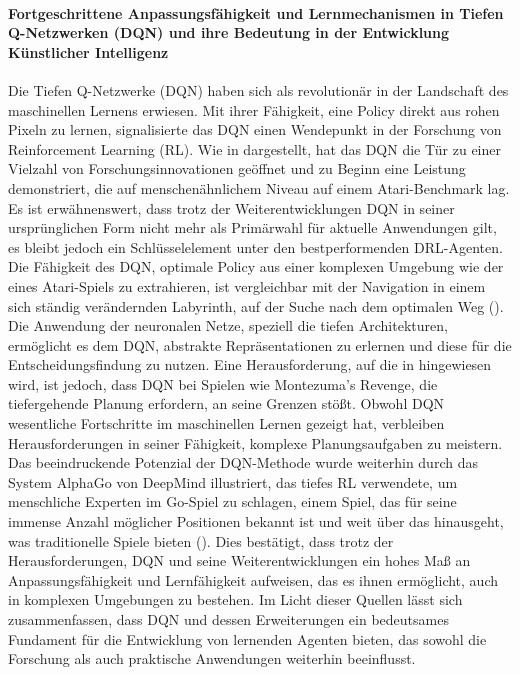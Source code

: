 \paragraph{Fortgeschrittene Anpassungsfähigkeit und Lernmechanismen in Tiefen Q-Netzwerken (DQN) und ihre Bedeutung in der Entwicklung Künstlicher Intelligenz}
%
Die Tiefen Q-Netzwerke (DQN) haben sich als revolutionär in der Landschaft des maschinellen Lernens erwiesen. Mit ihrer Fähigkeit, eine Policy direkt aus rohen Pixeln zu lernen, signalisierte das DQN einen Wendepunkt in der Forschung von Reinforcement Learning (RL). Wie in \cite{morales2020grokking} dargestellt, hat das DQN die Tür zu einer Vielzahl von Forschungsinnovationen geöffnet und zu Beginn eine Leistung demonstriert, die auf menschenähnlichem Niveau auf einem Atari-Benchmark lag. Es ist erwähnenswert, dass trotz der Weiterentwicklungen DQN in seiner ursprünglichen Form nicht mehr als Primärwahl für aktuelle Anwendungen gilt, es bleibt jedoch ein Schlüsselelement unter den bestperformenden DRL-Agenten.
%
Die Fähigkeit des DQN, optimale Policy aus einer komplexen Umgebung wie der eines Atari-Spiels zu extrahieren, ist vergleichbar mit der Navigation in einem sich ständig verändernden Labyrinth, auf der Suche nach dem optimalen Weg (\cite{russell2021ai}). Die Anwendung der neuronalen Netze, speziell die tiefen Architekturen, ermöglicht es dem DQN, abstrakte Repräsentationen zu erlernen und diese für die Entscheidungsfindung zu nutzen.
%
Eine Herausforderung, auf die in \cite{SuttonBarto2018} hingewiesen wird, ist jedoch, dass DQN bei Spielen wie Montezuma's Revenge, die tiefergehende Planung erfordern, an seine Grenzen stößt. Obwohl DQN wesentliche Fortschritte im maschinellen Lernen gezeigt hat, verbleiben Herausforderungen in seiner Fähigkeit, komplexe Planungsaufgaben zu meistern.
%
Das beeindruckende Potenzial der DQN-Methode wurde weiterhin durch das System AlphaGo von DeepMind illustriert, das tiefes RL verwendete, um menschliche Experten im Go-Spiel zu schlagen, einem Spiel, das für seine immense Anzahl möglicher Positionen bekannt ist und weit über das hinausgeht, was traditionelle Spiele bieten (\cite{russell2021ai}). Dies bestätigt, dass trotz der Herausforderungen, DQN und seine Weiterentwicklungen ein hohes Maß an Anpassungsfähigkeit und Lernfähigkeit aufweisen, das es ihnen ermöglicht, auch in komplexen Umgebungen zu bestehen.
%
Im Licht dieser Quellen lässt sich zusammenfassen, dass DQN und dessen Erweiterungen ein bedeutsames Fundament für die Entwicklung von lernenden Agenten bieten, das sowohl die Forschung als auch praktische Anwendungen weiterhin beeinflusst.
%

